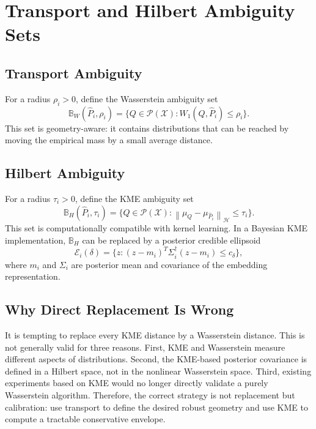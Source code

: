 \documentclass[10pt,journal]{IEEEtran}
\newcommand{\Pcal}{\mathcal{P}}
\newcommand{\Xcal}{\mathcal{X}}
\newcommand{\Hcal}{\mathcal{H}}
\newcommand{\wh}{\widehat}
\newcommand{\norm}[1]{\left\lVert #1 \right\rVert}
\newcommand{\ball}{\mathbb{B}}
\begin{document}
\section{Transport and Hilbert Ambiguity Sets}
\label{sec:sets}

\subsection{Transport Ambiguity}

For a radius $\rho_i>0$, define the Wasserstein ambiguity set
\begin{equation}
\label{eq:wball}
    \ball_W(\wh P_i,\rho_i)=\{Q\in\Pcal(\Xcal):W_1(Q,\wh P_i)\le \rho_i\}.
\end{equation}
This set is geometry-aware: it contains distributions that can be reached by moving the empirical mass by a small average distance.

\subsection{Hilbert Ambiguity}

For a radius $\tau_i>0$, define the KME ambiguity set
\begin{equation}
\label{eq:hball}
    \ball_H(\wh P_i,\tau_i)=\{Q\in\Pcal(\Xcal):\norm{\mu_Q-\mu_{\wh P_i}}_{\Hcal}\le \tau_i\}.
\end{equation}
This set is computationally compatible with kernel learning. In a Bayesian KME implementation, $\ball_H$ can be replaced by a posterior credible ellipsoid
\begin{equation}
\label{eq:ellipsoid}
    \mathcal{E}_i(\delta)=\{z:(z-m_i)^T\Sigma_i^\dagger(z-m_i)\le c_{\delta}\},
\end{equation}
where $m_i$ and $\Sigma_i$ are posterior mean and covariance of the embedding representation.

\subsection{Why Direct Replacement Is Wrong}

It is tempting to replace every KME distance by a Wasserstein distance. This is not generally valid for three reasons. First, KME and Wasserstein measure different aspects of distributions. Second, the KME-based posterior covariance is defined in a Hilbert space, not in the nonlinear Wasserstein space. Third, existing experiments based on KME would no longer directly validate a purely Wasserstein algorithm. Therefore, the correct strategy is not replacement but calibration: use transport to define the desired robust geometry and use KME to compute a tractable conservative envelope.
\end{document}
